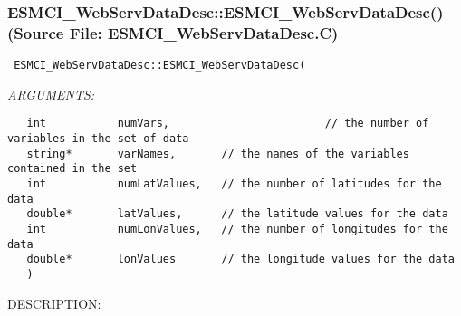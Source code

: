 
\setlength{\oldparskip}{\parskip}
\setlength{\parskip}{1.5ex}
\setlength{\oldparindent}{\parindent}
\setlength{\parindent}{0pt}
\setlength{\oldbaselineskip}{\baselineskip}
\setlength{\baselineskip}{11pt}
 
\def\bv{\begin{verbatim}}
\def\ev{\end{verbatim}}
\def\be{\begin{equation}}
\def\ee{\end{equation}}
\def\bea{\begin{eqnarray}}
\def\eea{\end{eqnarray}}
\def\bi{\begin{itemize}}
\def\ei{\end{itemize}}
\def\bn{\begin{enumerate}}
\def\en{\end{enumerate}}
\def\bd{\begin{description}}
\def\ed{\end{description}}
\def\({\left (}
\def\){\right )}
\def\[{\left [}
\def\]{\right ]}
\def\<{\left  \langle}
\def\>{\right \rangle}
\def\cI{{\cal I}}
\def\diag{\mathop{\rm diag}}
\def\tr{\mathop{\rm tr}}


 
\subsubsection{ESMCI\_WebServDataDesc::ESMCI\_WebServDataDesc() (Source File: ESMCI\_WebServDataDesc.C)}


  
\begin{verbatim} ESMCI_WebServDataDesc::ESMCI_WebServDataDesc(\end{verbatim}{\em ARGUMENTS:}
\begin{verbatim}   int           numVars,                        // the number of variables in the set of data
   string*       varNames,       // the names of the variables contained in the set
   int           numLatValues,   // the number of latitudes for the data
   double*       latValues,      // the latitude values for the data
   int           numLonValues,   // the number of longitudes for the data
   double*       lonValues       // the longitude values for the data
   )\end{verbatim}
{\sf DESCRIPTION:\\ }


